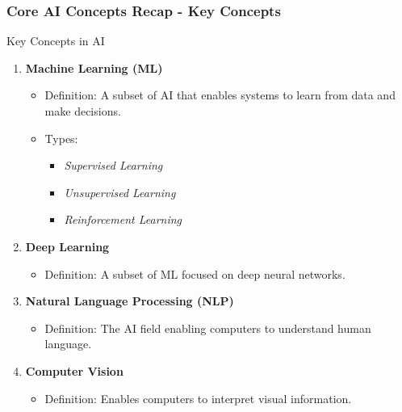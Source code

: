 \documentclass[aspectratio=169]{beamer}
\begin{document}
\begin{frame}[fragile]
    \frametitle{Core AI Concepts Recap - Key Concepts}
    \begin{block}{Key Concepts in AI}
        \begin{enumerate}
            \item \textbf{Machine Learning (ML)}
                \begin{itemize}
                    \item Definition: A subset of AI that enables systems to learn from data and make decisions.
                    \item Types:
                        \begin{itemize}
                            \item \textit{Supervised Learning}
                            \item \textit{Unsupervised Learning}
                            \item \textit{Reinforcement Learning}
                        \end{itemize}
                \end{itemize}
            \item \textbf{Deep Learning}
                \begin{itemize}
                    \item Definition: A subset of ML focused on deep neural networks.
                \end{itemize}
            \item \textbf{Natural Language Processing (NLP)}
                \begin{itemize}
                    \item Definition: The AI field enabling computers to understand human language.
                \end{itemize}
            \item \textbf{Computer Vision}
                \begin{itemize}
                    \item Definition: Enables computers to interpret visual information.
                \end{itemize}
        \end{enumerate}
    \end{block}
\end{frame}
\end{document}
